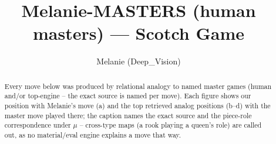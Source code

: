\documentclass[11pt]{article}
\title{Melanie-MASTERS (human masters) — Scotch Game}
\author{Melanie (Deep\_Vision)}
\date{}
\begin{document}
\maketitle

\begin{abstract}Every move below was produced by relational analogy to named master games (human and/or top-engine -- the exact source is named per move). Each figure shows our position with Melanie's move (a) and the top retrieved analog positions (b--d) with the master move played there; the caption names the exact source and the piece-role correspondence under $\mu$ -- cross-type maps (a rook playing a queen's role) are called out, as no material/eval engine explains a move that way.\end{abstract}

\begin{figure}[p]\centering
\begin{subfigure}{0.46\textwidth}\centering
\resizebox{\linewidth}{!}{%
\newchessgame
\chessboard[
  setfen={r1b1kb1r/p1ppqppp/2p2n2/4P3/8/8/PPP2PPP/RNBQKB1R w KQkq - 1 7},
  showmover=false,
  pgfstyle=straightmove, color=movearrow, markmove={d1-e2}
]}
\caption{}
\end{subfigure}\hfill
\begin{subfigure}{0.46\textwidth}\centering
\resizebox{\linewidth}{!}{%
\newchessgame
\chessboard[
  setfen={r1bqkb1r/ppp2p1p/5p2/3P2p1/7N/PPN2P2/3P2PP/R2QKB1R b KQkq - 0 12},
  showmover=false,
  pgfstyle=straightmove, color=movearrow, markmove={d8-e7}
]}
\caption{}
\end{subfigure}
\\[4pt]
\begin{subfigure}{0.46\textwidth}\centering
\resizebox{\linewidth}{!}{%
\newchessgame
\chessboard[
  setfen={r1bq1b1r/pppk3p/2n1p1B1/3pP1pQ/8/8/PPPN1PPP/R1B1K2R w KQ - 1 11},
  showmover=false,
  pgfstyle=straightmove, color=movearrow, markmove={c2-c4}
]}
\caption{}
\end{subfigure}\hfill
\begin{subfigure}{0.46\textwidth}\centering
\resizebox{\linewidth}{!}{%
\newchessgame
\chessboard[
  setfen={r3kb1r/pbqn1ppp/2p1p3/1p6/3PB3/4PN2/PPQ2PPP/R1B1K2R b KQkq - 2 11},
  showmover=false,
  pgfstyle=straightmove, color=movearrow, markmove={a8-c8}
]}
\caption{}
\end{subfigure}

\end{figure}
\end{document}

